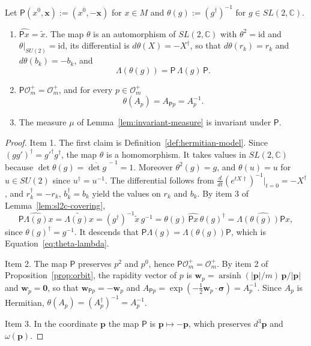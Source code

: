 \begin{lemma}\label{lem:inversion}
	Let $\mathsf{P}(x^0,\mathbf{x}):=(x^0,-\mathbf{x})$ for $x\in M$ and $\theta(g):=(g^\dagger)^{-1}$ for $g\in SL(2,\mathbb{C})$.
	\begin{enumerate}
		\item $\widehat{\mathsf{P}x}=\tilde{x}$. The map $\theta$ is an automorphism of $SL(2,\mathbb{C})$ with $\theta^2=\mathrm{id}$ and $\theta|_{SU(2)}=\mathrm{id}$, its differential is $d\theta(X)=-X^\dagger$, so that $d\theta(r_k)=r_k$ and $d\theta(b_k)=-b_k$, and
		\begin{equation}\label{eq:theta-lambda}
			\Lambda(\theta(g))=\mathsf{P}\,\Lambda(g)\,\mathsf{P}.
		\end{equation}
		\item $\mathsf{P}\mathcal{O}_m^+=\mathcal{O}_m^+$, and for every $p\in\mathcal{O}_m^+$
		\begin{equation}\label{eq:theta-boost}
			\theta(A_p)=A_{\mathsf{P}p}=A_p^{-1}.
		\end{equation}
		\item The measure $\mu$ of Lemma~\ref{lem:invariant-measure} is invariant under $\mathsf{P}$.
	\end{enumerate}
\end{lemma}

\begin{proof}
	Item 1. The first claim is Definition~\ref{def:hermitian-model}. Since $(gg')^\dagger=g'^\dagger g^\dagger$, the map $\theta$ is a homomorphism. It takes values in $SL(2,\mathbb{C})$ because $\det\theta(g)=\overline{\det g}^{\,-1}=1$. Moreover $\theta^2(g)=g$, and $\theta(u)=u$ for $u\in SU(2)$ since $u^\dagger=u^{-1}$. The differential follows from $\frac{d}{dt}(e^{tX\dagger})^{-1}|_{t=0}=-X^\dagger$, and $r_k^\dagger=-r_k$, $b_k^\dagger=b_k$ yield the values on $r_k$ and $b_k$. By item 3 of Lemma~\ref{lem:sl2c-covering},
	\begin{equation*}
		\widehat{\mathsf{P}\Lambda(g)x}=\widetilde{\Lambda(g)x}=(g^\dagger)^{-1}\tilde{x}\,g^{-1}=\theta(g)\,\widehat{\mathsf{P}x}\,\theta(g)^\dagger=\widehat{\Lambda(\theta(g))\mathsf{P}x},
	\end{equation*}
	since $\theta(g)^\dagger=g^{-1}$. It descends that $\mathsf{P}\Lambda(g)=\Lambda(\theta(g))\mathsf{P}$, which is Equation~\eqref{eq:theta-lambda}.
	
	Item 2. The map $\mathsf{P}$ preserves $p^2$ and $p^0$, hence $\mathsf{P}\mathcal{O}_m^+=\mathcal{O}_m^+$. By item 2 of Proposition~\ref{prop:orbit}, the rapidity vector of $p$ is $\mathbf{w}_p=\operatorname{arsinh}(|\mathbf{p}|/m)\,\mathbf{p}/|\mathbf{p}|$ and $\mathbf{w}_{\mathring{p}}=\mathbf{0}$, so that $\mathbf{w}_{\mathsf{P}p}=-\mathbf{w}_p$ and $A_{\mathsf{P}p}=\exp(-\tfrac12\mathbf{w}_p\cdot\boldsymbol{\sigma})=A_p^{-1}$. Since $A_p$ is Hermitian, $\theta(A_p)=(A_p^\dagger)^{-1}=A_p^{-1}$.
	
	Item 3. In the coordinate $\mathbf{p}$ the map $\mathsf{P}$ is $\mathbf{p}\mapsto-\mathbf{p}$, which preserves $d^3\mathbf{p}$ and $\omega(\mathbf{p})$.
\end{proof}

